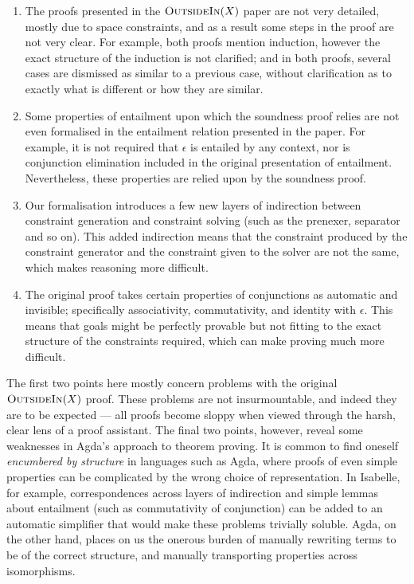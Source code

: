 \documentclass[a4paper]{jfp}
\newcommand{\outsidein}{\textsc{OutsideIn}(X)}
\begin{document}
\begin{enumerate}
      \item The proofs presented in the $\outsidein$ paper are not very detailed, mostly due to space constraints, and as a result some steps in the
         proof are not very clear. For example, both proofs mention induction, however the exact structure of the induction is not clarified; and in
         both proofs, several cases are dismissed as similar to a previous case, without clarification as to exactly what is different or how they are
         similar.
      \item Some properties of entailment upon which the soundness proof relies are not even formalised in the entailment relation presented in the
         paper. For example, it is not required that $\epsilon$ is entailed by any context, nor is conjunction elimination included in the original
         presentation of entailment.  Nevertheless, these properties are relied upon by the soundness proof. 
      \item Our formalisation introduces a few new layers of indirection between constraint generation and constraint solving (such as the prenexer,
         separator and so on). This added indirection means that the constraint produced by the constraint generator and the constraint given to the
         solver are not the same, which makes reasoning more difficult.
      \item The original proof takes certain properties of conjunctions as automatic and invisible; specifically associativity, commutativity, and
         identity with $\epsilon$.  This means that goals might be perfectly provable but not fitting to the exact structure of the constraints
         required, which can make proving much more difficult. 
\end{enumerate}            

The first two points here mostly concern problems with the original $\outsidein$ proof. These problems are not insurmountable, and indeed they are to
be expected --- all proofs become sloppy when viewed through the harsh, clear lens of a proof assistant. The final two points, however, reveal some
weaknesses in Agda's approach to theorem proving. It is common to find oneself \emph{encumbered by structure} in languages such as Agda, where proofs
of even simple properties can be complicated by the wrong choice of representation. In Isabelle, for example, correspondences across layers of
indirection and simple lemmas about entailment (such as commutativity of conjunction) can be added to an automatic simplifier that would make these
problems trivially soluble. Agda, on the other hand, places on us the onerous burden of manually rewriting terms to be of the correct structure, and
manually transporting properties across isomorphisms.
\end{document}

